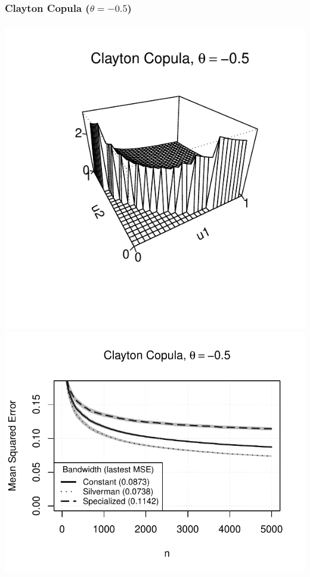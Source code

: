\documentclass[aspectratio=169]{beamer}
\begin{document}
		\subsubsection{Clayton Copula ($ \theta = -0.5 $)}
			\begin{frame}
				\frametitle{\insertsubsubsection}
				
				\begin{flushleft}
					\includegraphics[width=0.4\linewidth]{plots/numerical_results/clayton_05}
					\includegraphics[width=0.5\linewidth]{../text/plots/experiment_results/clayton_05}
				\end{flushleft}
				
			\end{frame}
			
		
\end{document}

